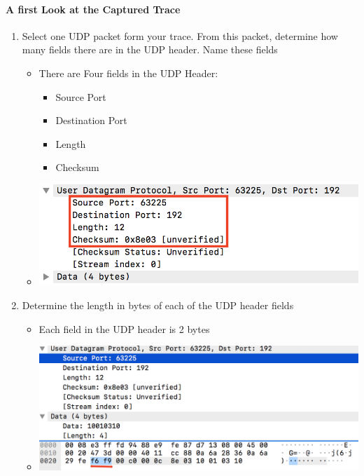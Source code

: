 \documentclass{article}
\begin{document}
\paragraph{A first Look at the Captured Trace}
  \begin{enumerate}
    \item Select one UDP packet form your trace.  From this packet, determine how many fields there are in the UDP header.  Name these fields
        \begin{itemize}
          \item There are Four fields in the UDP Header:
            \begin{itemize}
              \item Source Port
              \item Destination Port
              \item Length
              \item Checksum
            \end{itemize}
          \item \includegraphics[scale=0.5]{images/UDP1.png}
        \end{itemize}

    \item Determine the length in bytes of each of the UDP header fields
        \begin{itemize}
          \item Each field in the UDP header is 2 bytes
          \item \includegraphics[scale=0.5]{images/UDP2.png}
        \end{itemize}


\end{enumerate}
\end{document}
